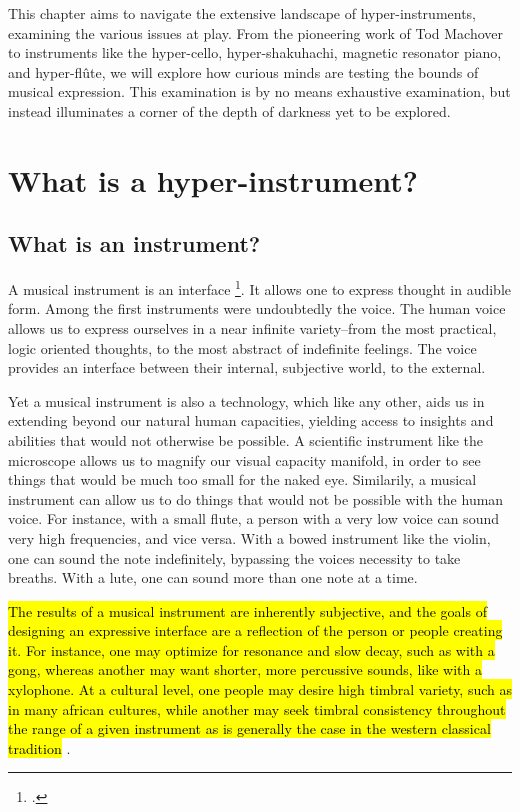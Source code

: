 \documentclass[12pt,twoside,maitrise]{dms_ks}
\theoremstyle{definition}
\begin{document}
This chapter aims to navigate the extensive landscape of hyper-instruments, examining the various issues at play.
From the pioneering work of Tod Machover to instruments like the hyper-cello, hyper-shakuhachi, magnetic resonator piano, and hyper-flûte, we will explore how curious minds are testing the bounds of musical expression.
This examination is by no means exhaustive examination, but instead illuminates a corner of the depth of darkness yet to be explored. 

\section{What is a hyper-instrument?}

\subsection{What is an instrument?}

A musical instrument is an interface \footcite{noauthor_instrument_nodate}. 
It allows one to express thought in audible form. 
Among the first instruments were undoubtedly the voice. 
The human voice allows us to express ourselves in a near infinite variety--from the most practical, logic oriented thoughts, to the most abstract of indefinite feelings. 
The voice provides an interface between their internal, subjective world, to the external. 

Yet a musical instrument is also a technology, which like any other, aids us in extending beyond our natural human capacities, yielding access to insights and abilities that would not otherwise be possible. 
A scientific instrument like the microscope allows us to magnify our visual capacity manifold, in order to see things that would be much too small for the naked eye. 
Similarily, a musical instrument can allow us to do things that would not be possible with the human voice. 
For instance, with a small flute, a person with a very low voice can sound very high frequencies, and vice versa. 
With a bowed instrument like the violin, one can sound the note indefinitely, bypassing the voices necessity to take breaths. 
With a lute, one can sound more than one note at a time. 

\hl{The results of a musical instrument are inherently subjective, and the goals of designing an expressive interface are a reflection of the person or people creating it. 
For instance, one may optimize for resonance and slow decay, such as with a gong, whereas another may want shorter, more percussive sounds, like with a xylophone. 
At a cultural level, one people may desire high timbral variety, such as in many african cultures, while another may seek timbral consistency throughout the range of a given instrument as is generally the case in the western classical tradition} . 
\end{document}
